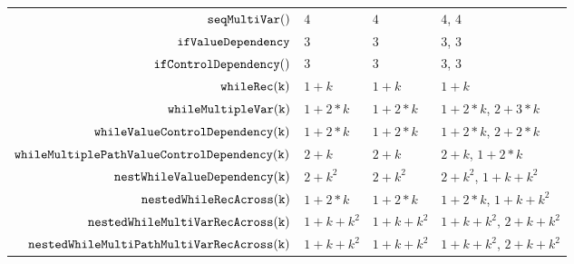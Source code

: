 \begin {table}[H]
\begin{center}
{\begin{tabular}{ r | p{12mm} p{55mm} p{\textwidth}}
         $\mathtt{seqMultiVar()}$ & $4$ & $4$ & $4$, $4$ \\  
         $ \mathtt{ifValueDependency}$ & $3$ & $3$ & $3$, $3$ \\
         $\mathtt{ifControlDependency()}$ & $3$ & $3$ & $3$, $3$  \\
         $ \mathtt{whileRec(k)}$ & $1+k$ & $1+k$ & $1+k$  \\
         $ \mathtt{whileMultipleVar(k)}$ & $1 + 2*k$ & $1 + 2*k$ & $1 + 2*k$, $2 + 3 * k$  \\
         $ \mathtt{whileValueControlDependency(k)}$ & $1 + 2*k$ & $1 + 2*k$ & $1 + 2 * k$, $2 + 2 * k$  \\
         $ \mathtt{whileMultiplePathValueControlDependency(k)}$ & $2 + k$ & $2 + k$  & $2 + k$, $1 + 2 * k$   \\
         $ \mathtt{nestWhileValueDependency(k)}$ & $2 + k^2$ & $2 + k^2$  & $2 + k^2$, $1 + k + k^2$   \\
         $ \mathtt{nestedWhileRecAcross(k)}$ & $1 + 2*k$ & $1 + 2*k$ & $1 + 2*k$,  $1 + k + k^2$   \\
         $ \mathtt{nestedWhileMultiVarRecAcross(k)}$ & $1 + k + k^2$ & $1 + k + k^2$  & $1 + k + k^2$,  $2 + k + k^2$  \\
         $ \mathtt{nestedWhileMultiPathMultiVarRecAcross(k)}$ & $1 + k + k^2$ & $1 + k + k^2$  & $1 + k + k^2$,  $2 + k + k^2$  \\
        \end{tabular}
}        
\end{center}
\end{table}
